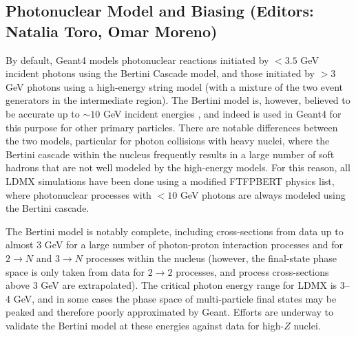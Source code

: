 
\subsection{Photonuclear Model and Biasing (Editors: Natalia Toro, Omar Moreno)}
\label{ssec:photonuclear}
By default, Geant4 models photonuclear reactions initiated by $<3.5$ GeV incident photons using the Bertini Cascade model, and those initiated by $>3$ GeV photons using a high-energy string model (with a mixture of the two event generators in the intermediate region).  The Bertini model is, however, believed to be accurate up to $\sim 10$ GeV incident energies \cite{DennisPrivateCommunication}, and indeed is used in Geant4 for this purpose for other primary particles.  There are notable differences between the two models, particular for photon collisions with heavy nuclei, where the Bertini cascade within the nucleus frequently results in a large number of soft hadrons that are not well modeled  by the high-energy models.  For this reason, all LDMX simulations have been done using a modified FTFPBERT physics list, where photonuclear processes with $<10$ GeV photons are always modeled using the Bertini cascade.

The Bertini model is notably complete, including cross-sections from data up to almost 3 GeV for a large number of photon-proton interaction processes and for $2\rightarrow N$ and $3\rightarrow N$ processes within the nucleus (however, the final-state phase space is only taken  from data for $2\rightarrow 2$ processes, and process cross-sections above 3 GeV are extrapolated).  The critical photon energy range for LDMX is 3--4 GeV, and in some cases the phase space of multi-particle final states may be peaked and therefore poorly approximated by Geant.  Efforts are underway to validate the Bertini model at these energies against data for high-$Z$ nuclei. 
